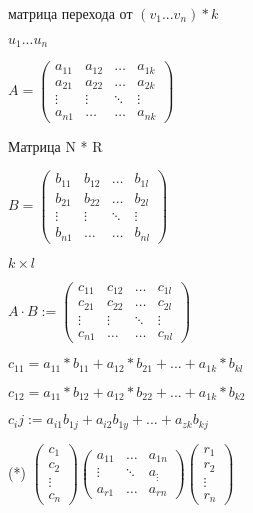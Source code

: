 матрица перехода от $(v_1 ... v_n) * k $

$u_1 ... u_n$

\begin{definition}
    $A = \left(
    \begin{array}{cccc}
        a_{11} & a_{12} & \ldots & a_{1k}\\
        a_{21} & a_{22} & \ldots & a_{2k}\\
        \vdots & \vdots & \ddots & \vdots\\
        a_{n1} &\ldots & \ldots & a_{nk}
    \end{array}
    \right)$

    Матрица N * R

    $B = \left(
    \begin{array}{cccc}
        b_{11} & b_{12} & \ldots & b_{1l}\\
        b_{21} & b_{22} & \ldots & b_{2l}\\
        \vdots & \vdots & \ddots & \vdots\\
        b_{n1} &\ldots & \ldots & b_{nl}
    \end{array}
    \right)$

    $k \times l$

    $A \cdot B := \left(
        \begin{array}{cccc}
            c_{11} & c_{12} & \ldots & c_{1l}\\
            c_{21} & c_{22} & \ldots & c_{2l}\\
            \vdots & \vdots & \ddots & \vdots\\
            c_{n1} &\ldots & \ldots & c_{nl}
        \end{array}
        \right)$

    $c_{11} = a_{11} * b_{11} + a_{12} * b_{21} + ... + a_{1k} * b_{kl}$

    $c_{12} = a_{11} * b_{12} + a_{12} * b_{22} + ... + a_{1k} * b_{k2}$


\end{definition}

$c_ij := a_{i1} b_{1j} + a_{i2} b_{1y} + ... + a_{zk} b_{kj}$


(*) $\left(
    \begin{array}{c}
        c_{1} \\
        c_{2} \\
        \vdots \\
        c_{n} 
    \end{array}
    \right) \left(
        \begin{array}{ccc}
            a_{11} & \ldots & a_{1n}\\
            \vdots & \ddots & a_{\vdots}\\
            a_{r1} &\ldots & a_{rn}
        \end{array}
        \right) \left(
            \begin{array}{c}
                r_{1}\\
                r_{2}\\
                \vdots\\
                r_{n}
            \end{array}
            \right)$

